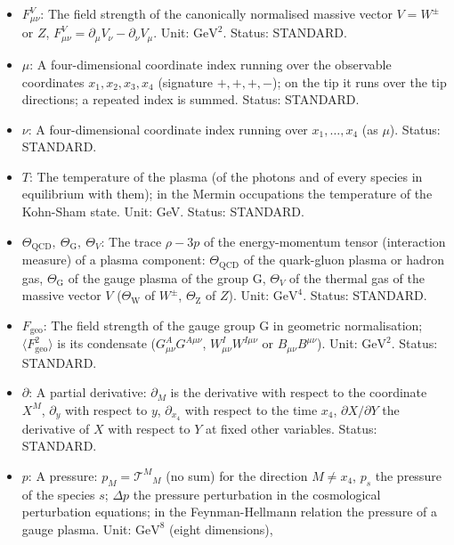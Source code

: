\documentclass[
  10pt,
]{article}
\providecommand{\tightlist}{%
  \setlength{\itemsep}{0pt}\setlength{\parskip}{0pt}}
\begin{document}
\begin{itemize}
\tightlist
\item
  \(F^V_{\mu\nu}\): The field strength of the canonically normalised
  massive vector \(V = W^\pm\) or \(Z\),
  \(F^V_{\mu\nu} = \partial_\mu V_\nu - \partial_\nu V_\mu\). Unit:
  \(\mathrm{GeV}^{2}\). Status: STANDARD.
\item
  \(\mu\): A four-dimensional coordinate index running over the
  observable coordinates \(x_1, x_2, x_3, x_4\) (signature \(+,+,+,-\));
  on the tip it runs over the tip directions; a repeated index is
  summed. Status: STANDARD.
\item
  \(\nu\): A four-dimensional coordinate index running over
  \(x_1, \dots, x_4\) (as \(\mu\)). Status: STANDARD.
\item
  \(T\): The temperature of the plasma (of the photons and of every
  species in equilibrium with them); in the Mermin occupations the
  temperature of the Kohn-Sham state. Unit: GeV. Status: STANDARD.
\item
  \(\Theta_{\mathrm{QCD}},\ \Theta_{\mathrm{G}},\ \Theta_V\): The trace
  \(\rho - 3p\) of the energy-momentum tensor (interaction measure) of a
  plasma component: \(\Theta_{\mathrm{QCD}}\) of the quark-gluon plasma
  or hadron gas, \(\Theta_{\mathrm{G}}\) of the gauge plasma of the
  group G, \(\Theta_V\) of the thermal gas of the massive vector \(V\)
  (\(\Theta_{\mathrm{W}}\) of \(W^\pm\), \(\Theta_{\mathrm{Z}}\) of
  \(Z\)). Unit: \(\mathrm{GeV}^{4}\). Status: STANDARD.
\item
  \(F_{\mathrm{geo}}\): The field strength of the gauge group G in
  geometric normalisation; \(\langle F_{\mathrm{geo}}^2\rangle\) is its
  condensate (\(G^A_{\mu\nu}G^{A\mu\nu}\), \(W^I_{\mu\nu}W^{I\mu\nu}\)
  or \(B_{\mu\nu}B^{\mu\nu}\)). Unit: \(\mathrm{GeV}^{2}\). Status:
  STANDARD.
\item
  \(\partial\): A partial derivative: \(\partial_M\) is the derivative
  with respect to the coordinate \(X^M\), \(\partial_y\) with respect to
  \(y\), \(\partial_{x_4}\) with respect to the time \(x_4\),
  \(\partial X/\partial Y\) the derivative of \(X\) with respect to
  \(Y\) at fixed other variables. Status: STANDARD.
\item
  \(p\): A pressure: \(p_M = \mathcal{T}^M{}_M\) (no sum) for the
  direction \(M \ne x_4\), \(p_s\) the pressure of the species \(s\);
  \(\Delta p\) the pressure perturbation in the cosmological
  perturbation equations; in the Feynman-Hellmann relation the pressure
  of a gauge plasma. Unit: \(\mathrm{GeV}^{8}\) (eight dimensions),

\end{itemize}
\end{document}
